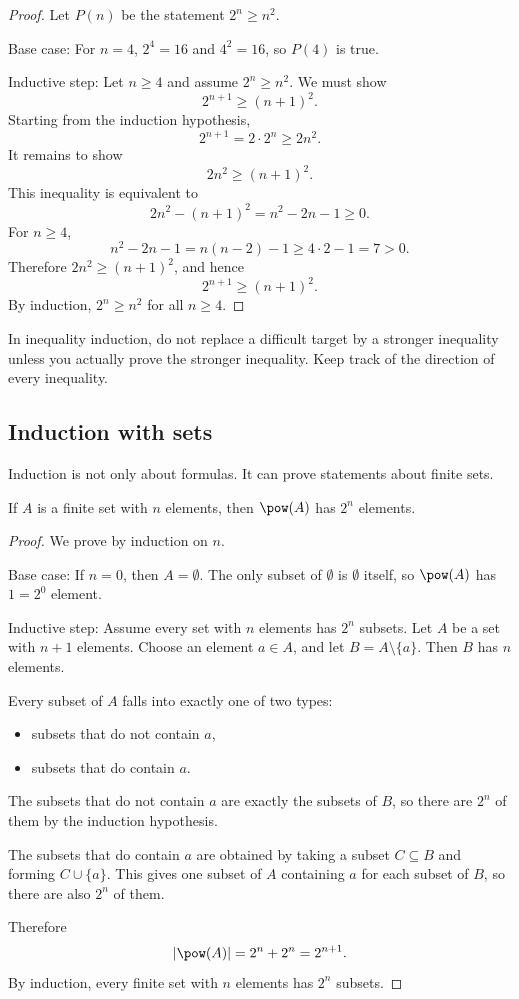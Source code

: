 \begin{proof}
Let $P(n)$ be the statement $2^n\geq n^2$.

Base case: For $n=4$, $2^4=16$ and $4^2=16$, so $P(4)$ is true.

Inductive step: Let $n\geq4$ and assume $2^n\geq n^2$. We must show
\[
2^{n+1}\geq(n+1)^2.
\]
Starting from the induction hypothesis,
\[
2^{n+1}=2\cdot2^n\geq2n^2.
\]
It remains to show
\[
2n^2\geq(n+1)^2.
\]
This inequality is equivalent to
\[
2n^2-(n+1)^2=n^2-2n-1\geq0.
\]
For $n\geq4$,
\[
n^2-2n-1=n(n-2)-1\geq4\cdot2-1=7>0.
\]
Therefore $2n^2\geq(n+1)^2$, and hence
\[
2^{n+1}\geq(n+1)^2.
\]
By induction, $2^n\geq n^2$ for all $n\geq4$.
\end{proof}

\begin{trapbox}
In inequality induction, do not replace a difficult target by a stronger inequality unless you actually prove the stronger inequality. Keep track of the direction of every inequality.
\end{trapbox}

\subsection{Induction with sets}

Induction is not only about formulas. It can prove statements about finite sets.

\begin{theorem}
If $A$ is a finite set with $n$ elements, then $\pow(A)$ has $2^n$ elements.
\end{theorem}

\begin{proof}
We prove by induction on $n$.

Base case: If $n=0$, then $A=\emptyset$. The only subset of $\emptyset$ is $\emptyset$ itself, so $\pow(A)$ has $1=2^0$ element.

Inductive step: Assume every set with $n$ elements has $2^n$ subsets. Let $A$ be a set with $n+1$ elements. Choose an element $a\in A$, and let $B=A\setminus\{a\}$. Then $B$ has $n$ elements.

Every subset of $A$ falls into exactly one of two types:

\begin{itemize}
\item subsets that do not contain $a$,
\item subsets that do contain $a$.
\end{itemize}

The subsets that do not contain $a$ are exactly the subsets of $B$, so there are $2^n$ of them by the induction hypothesis.

The subsets that do contain $a$ are obtained by taking a subset $C\subseteq B$ and forming $C\cup\{a\}$. This gives one subset of $A$ containing $a$ for each subset of $B$, so there are also $2^n$ of them.

Therefore
\[
|\pow(A)|=2^n+2^n=2^{n+1}.
\]
By induction, every finite set with $n$ elements has $2^n$ subsets.
\end{proof}

